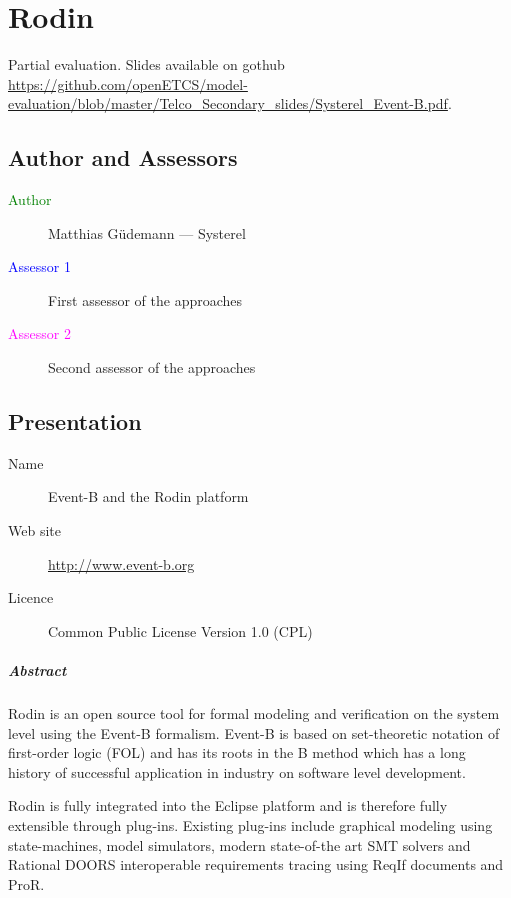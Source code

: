 \chapter{Rodin}
\label{sec:rodin}


Partial evaluation.
Slides available on gothub \url{https://github.com/openETCS/model-evaluation/blob/master/Telco_Secondary_slides/Systerel_Event-B.pdf}.

\section{Author and Assessors}

\begin{description}
\item[\textcolor{green}{Author}] Matthias Güdemann --- Systerel
\item[\textcolor{blue}{Assessor 1}] First assessor of the approaches 
\item[\textcolor{magenta}{Assessor 2}] Second assessor of the approaches 
\end{description}

\section{Presentation}

\begin{description}
\item[Name] Event-B and the Rodin platform
\item[Web site] \url{http://www.event-b.org}
\item[Licence] Common Public License Version 1.0 (CPL)
\end{description}

\paragraph{Abstract}

Rodin is an open source tool for formal modeling and verification on the system
level using the Event-B formalism. Event-B is based on set-theoretic notation of
first-order logic (FOL) and has its roots in the B method which has a long
history of successful application in industry on software level development.

Rodin is fully integrated into the Eclipse platform and is therefore fully
extensible through plug-ins. Existing plug-ins include graphical modeling using
state-machines, model simulators, modern state-of-the art SMT solvers and
Rational DOORS interoperable requirements tracing using ReqIf documents and
ProR.

